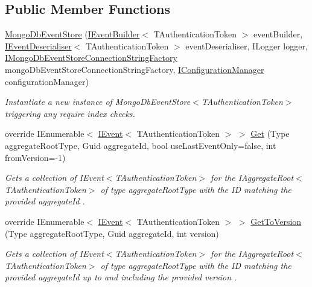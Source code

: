 \subsection*{Public Member Functions}
\begin{DoxyCompactItemize}
\item 
\hyperlink{classCqrs_1_1MongoDB_1_1Events_1_1MongoDbEventStore_a37e57e6f1e4e545630c1c98a5aab46a3_a37e57e6f1e4e545630c1c98a5aab46a3}{Mongo\+Db\+Event\+Store} (\hyperlink{interfaceCqrs_1_1Events_1_1IEventBuilder}{I\+Event\+Builder}$<$ T\+Authentication\+Token $>$ event\+Builder, \hyperlink{interfaceCqrs_1_1Events_1_1IEventDeserialiser}{I\+Event\+Deserialiser}$<$ T\+Authentication\+Token $>$ event\+Deserialiser, I\+Logger logger, \hyperlink{interfaceCqrs_1_1MongoDB_1_1Events_1_1IMongoDbEventStoreConnectionStringFactory}{I\+Mongo\+Db\+Event\+Store\+Connection\+String\+Factory} mongo\+Db\+Event\+Store\+Connection\+String\+Factory, \hyperlink{interfaceCqrs_1_1Configuration_1_1IConfigurationManager}{I\+Configuration\+Manager} configuration\+Manager)
\begin{DoxyCompactList}\small\item\em Instantiate a new instance of Mongo\+Db\+Event\+Store$<$\+T\+Authentication\+Token$>$ triggering any require index checks. \end{DoxyCompactList}\item 
override I\+Enumerable$<$ \hyperlink{interfaceCqrs_1_1Events_1_1IEvent}{I\+Event}$<$ T\+Authentication\+Token $>$ $>$ \hyperlink{classCqrs_1_1MongoDB_1_1Events_1_1MongoDbEventStore_a7a1ac8e59dc5bff0bb6562fb4f43e8df_a7a1ac8e59dc5bff0bb6562fb4f43e8df}{Get} (Type aggregate\+Root\+Type, Guid aggregate\+Id, bool use\+Last\+Event\+Only=false, int from\+Version=-\/1)
\begin{DoxyCompactList}\small\item\em Gets a collection of I\+Event$<$\+T\+Authentication\+Token$>$ for the I\+Aggregate\+Root$<$\+T\+Authentication\+Token$>$ of type {\itshape aggregate\+Root\+Type}  with the ID matching the provided {\itshape aggregate\+Id} . \end{DoxyCompactList}\item 
override I\+Enumerable$<$ \hyperlink{interfaceCqrs_1_1Events_1_1IEvent}{I\+Event}$<$ T\+Authentication\+Token $>$ $>$ \hyperlink{classCqrs_1_1MongoDB_1_1Events_1_1MongoDbEventStore_ad319a5e79600fa5a10c2ecb436533a11_ad319a5e79600fa5a10c2ecb436533a11}{Get\+To\+Version} (Type aggregate\+Root\+Type, Guid aggregate\+Id, int version)
\begin{DoxyCompactList}\small\item\em Gets a collection of I\+Event$<$\+T\+Authentication\+Token$>$ for the I\+Aggregate\+Root$<$\+T\+Authentication\+Token$>$ of type {\itshape aggregate\+Root\+Type}  with the ID matching the provided {\itshape aggregate\+Id}  up to and including the provided {\itshape version} . \end{DoxyCompactList}\item 

\end{DoxyCompactItemize}
